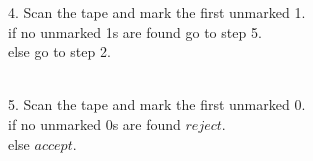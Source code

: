 \documentclass{article}
\begin{document}
4. Scan the tape and mark the first unmarked 1. \\ \parindent=12pt
   if no unmarked 1s are found go to step 5. \\ 
   else go to step 2. \\ \ \\ \parindent=0pt

5. Scan the tape and mark the first unmarked 0. \\ \parindent=12pt
   if no unmarked 0s are found $reject$. \\
   else $accept$. \\ \ \\ \parindent=0pt
\end{document}

